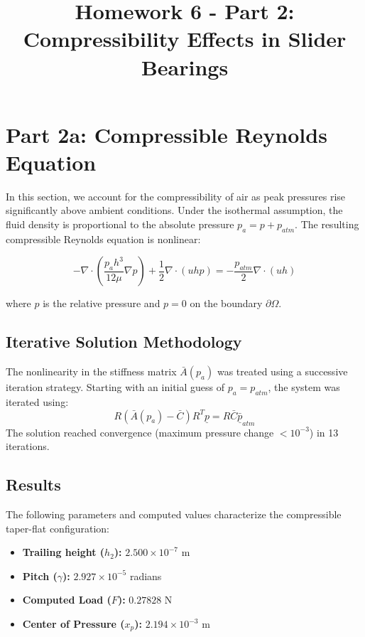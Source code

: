 \documentclass{article}
\title{Homework 6 - Part 2: Compressibility Effects in Slider Bearings}
\author{}
\date{}
\begin{document}
\maketitle

\section*{Part 2a: Compressible Reynolds Equation}
In this section, we account for the compressibility of air as peak pressures rise significantly above ambient conditions. Under the isothermal assumption, the fluid density is proportional to the absolute pressure $p_a = p + p_{atm}$. The resulting compressible Reynolds equation is nonlinear:

\begin{equation}
    -\nabla \cdot \left( \frac{p_a h^3}{12\mu} \nabla p \right) + \frac{1}{2} \nabla \cdot (uhp) = -\frac{p_{atm}}{2} \nabla \cdot (uh)
\end{equation}

where $p$ is the relative pressure and $p=0$ on the boundary $\partial \Omega$.

\subsection*{Iterative Solution Methodology}
The nonlinearity in the stiffness matrix $\bar{A}(p_a)$ was treated using a successive iteration strategy. Starting with an initial guess of $p_a = p_{atm}$, the system was iterated using:
\begin{equation}
    R(\bar{A}(p_a) - \bar{C})R^T \underline{p} = R\bar{C}\underline{\bar{p}}_{atm}
\end{equation}
The solution reached convergence (maximum pressure change $< 10^{-3}$) in 13 iterations.

\subsection*{Results}
The following parameters and computed values characterize the compressible taper-flat configuration:

\begin{itemize}
    \item \textbf{Trailing height ($h_2$):} $2.500 \times 10^{-7}$ m
    \item \textbf{Pitch ($\gamma$):} $2.927 \times 10^{-5}$ radians
    \item \textbf{Computed Load ($F$):} $0.27828$ N
    \item \textbf{Center of Pressure ($x_p$):} $2.194 \times 10^{-3}$ m
\end{itemize}
\end{document}
